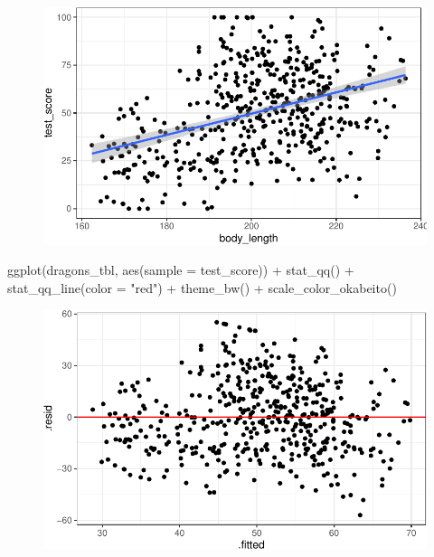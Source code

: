 \documentclass[
  letterpaper,
  DIV=11,
  oneside]{scrreport}
\newenvironment{Shaded}{\begin{snugshade}}{\end{snugshade}}
\newcommand{\AttributeTok}[1]{\textcolor[rgb]{0.40,0.45,0.13}{#1}}
\newcommand{\FunctionTok}[1]{\textcolor[rgb]{0.28,0.35,0.67}{#1}}
\newcommand{\NormalTok}[1]{\textcolor[rgb]{0.00,0.23,0.31}{#1}}
\newcommand{\SpecialCharTok}[1]{\textcolor[rgb]{0.37,0.37,0.37}{#1}}
\newcommand{\StringTok}[1]{\textcolor[rgb]{0.13,0.47,0.30}{#1}}
\begin{document}
\begin{figure}[H]

{\centering \includegraphics{./stat-modeling-mixed_files/figure-pdf/unnamed-chunk-7-1.pdf}

}

\end{figure}

\begin{Shaded}
\begin{Highlighting}[]
\FunctionTok{ggplot}\NormalTok{(dragons\_tbl, }\FunctionTok{aes}\NormalTok{(}\AttributeTok{sample =}\NormalTok{ test\_score)) }\SpecialCharTok{+}
  \FunctionTok{stat\_qq}\NormalTok{() }\SpecialCharTok{+} \FunctionTok{stat\_qq\_line}\NormalTok{(}\AttributeTok{color =} \StringTok{"red"}\NormalTok{) }\SpecialCharTok{+}
  \FunctionTok{theme\_bw}\NormalTok{() }\SpecialCharTok{+}
  \FunctionTok{scale\_color\_okabeito}\NormalTok{()}
\end{Highlighting}
\end{Shaded}

\begin{figure}[H]

{\centering \includegraphics{./stat-modeling-mixed_files/figure-pdf/unnamed-chunk-8-1.pdf}

}

\end{figure}
\end{document}
